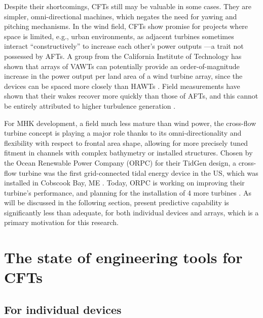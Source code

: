 Despite their shortcomings, CFTs still may be valuable in some cases. They are
simpler, omni-directional machines, which negates the need for yawing and
pitching mechanisms. In the wind field, CFTs show promise for projects where
space is limited, e.g., urban environments, as adjacent turbines sometimes
interact ``constructively'' to increase each other's power outputs
\cite{Li2010}---a trait not possessed by AFTs. A group from the California
Institute of Technology has shown that arrays of VAWTs can potentially provide
an order-of-magnitude increase in the power output per land area of a wind
turbine array, since the devices can be spaced more closely than HAWTs
\cite{Dabiri2011}. Field measurements have shown that their wakes recover more
quickly than those of AFTs, and this cannot be entirely attributed to higher
turbulence generation \cite{Kinzel2012}.

For MHK development, a field much less mature than wind power, the cross-flow
turbine concept is playing a major role thanks to its omni-directionality and
flexibility with respect to frontal area shape, allowing for more precisely
tuned fitment in channels with complex bathymetry or installed structures.
Chosen by the Ocean Renewable Power Company (ORPC) for their TidGen design, a
cross-flow turbine was the first grid-connected tidal energy device in the US,
which was installed in Cobscook Bay, ME \cite{ORPC2012}. Today, ORPC is working
on improving their turbine's performance, and planning for the installation of 4
more turbines \cite{Nelson2013}. As will be discussed in the following section,
present predictive capability is significantly less than adequate, for both
individual devices and arrays, which is a primary motivation for this research.


\section{The state of engineering tools for CFTs}

\subsection{For individual devices}


